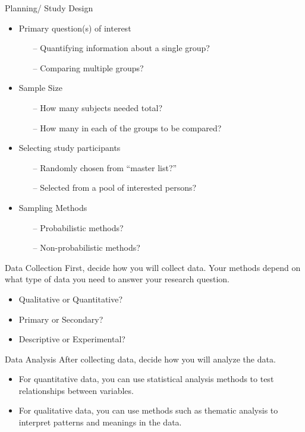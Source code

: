 \begin{frame}[t]{Planning/ Study Design}
	\begin{itemize}
		\item Primary question(s) of interest
		\begin{itemize}
			\item[--] Quantifying information about a single group?
			\item [--] Comparing multiple groups?
		\end{itemize}
		\item Sample Size 
		\begin{itemize}
			\item[--] How many subjects needed total?
			\item [--] How many in each of the groups to be compared?
		\end{itemize}
	
		\item Selecting study participants
		\begin{itemize}
			\item [--] Randomly chosen from “master list?”
			\item [--]Selected from a pool of interested persons?
		\end{itemize}
	
		\item Sampling Methods 
		\begin{itemize}
			\item [--] Probabilistic methods?
			\item [--] Non-probabilistic methods?
		\end{itemize}
	\end{itemize}
\end{frame}


\begin{frame}[t]{Data Collection}
	First, decide how you will collect data. Your methods depend on what type 
	of data you need to answer your research question. 
	\begin{itemize}
		\item Qualitative or Quantitative?
		\item Primary or Secondary?
		\item Descriptive or Experimental?
	\end{itemize}
\end{frame}


\begin{frame}[t]{Data Analysis}
	After collecting data, decide how you will analyze the data.
	\begin{itemize}
		\item For quantitative data, you can use statistical analysis methods 
		to test relationships between variables.
		\item For qualitative data, you can use methods such as thematic 
		analysis to interpret patterns and meanings in the data.
	\end{itemize}
\end{frame}


